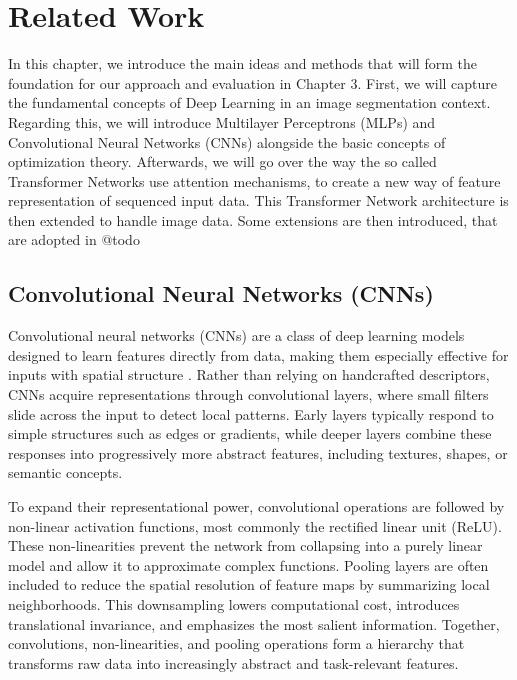 \chapter{Related Work} %
\label{State of the art}

In this chapter, we introduce the main ideas and methods that will form the foundation for our approach and evaluation in Chapter 3.
First, we will capture the fundamental concepts of Deep Learning in an image segmentation context. Regarding this, we will introduce Multilayer Perceptrons (MLPs) and Convolutional Neural Networks (CNNs) alongside the basic concepts of optimization theory. Afterwards, we will go over the way the so called Transformer Networks use attention mechanisms, to create a new way of feature representation of sequenced input data. This Transformer Network architecture is then extended to handle image data. Some extensions are then introduced, that are adopted in @todo


\section{Convolutional Neural Networks (CNNs)}

Convolutional neural networks (CNNs) are a class of deep learning models designed to learn features directly from data, making them especially effective for inputs with spatial structure \cite{LeCun.1989}. Rather than relying on handcrafted descriptors, CNNs acquire representations through convolutional layers, where small filters slide across the input to detect local patterns. Early layers typically respond to simple structures such as edges or gradients, while deeper layers combine these responses into progressively more abstract features, including textures, shapes, or semantic concepts.

To expand their representational power, convolutional operations are followed by non-linear activation functions, most commonly the rectified linear unit (ReLU). These non-linearities prevent the network from collapsing into a purely linear model and allow it to approximate complex functions. Pooling layers are often included to reduce the spatial resolution of feature maps by summarizing local neighborhoods. This downsampling lowers computational cost, introduces translational invariance, and emphasizes the most salient information. Together, convolutions, non-linearities, and pooling operations form a hierarchy that transforms raw data into increasingly abstract and task-relevant features.

